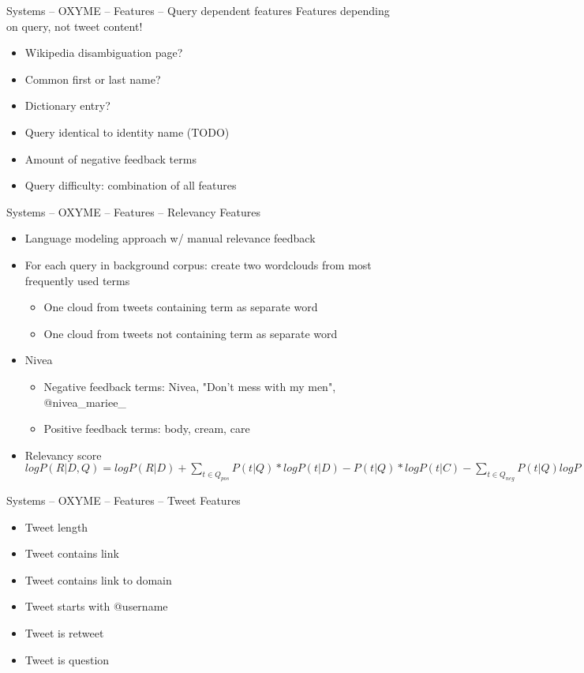 \documentclass[12pt,a4paper]{beamer}
\begin{document}
\begin{frame}{Systems -- OXYME -- Features -- Query dependent features}
Features depending on query, not tweet content!
\begin{itemize}
\item Wikipedia disambiguation page?
\item Common first or last name?
\item Dictionary entry?
\item Query identical to identity name (TODO)
\item Amount of negative feedback terms
\item Query difficulty: combination of all features
\end{itemize}

\end{frame}


\begin{frame}{Systems -- OXYME -- Features -- Relevancy Features}
\begin{itemize}
\item Language modeling approach w/ manual relevance feedback
\item For each query in background corpus: create two wordclouds from most frequently used terms
  \begin{itemize}
  \item One cloud from tweets containing term as separate word
  \item One cloud from tweets not containing term as separate word
  \end{itemize}
\item Nivea
  \begin{itemize}
  \item Negative feedback terms: Nivea, "Don't mess with my men", @nivea\_mariee\_
  \item Positive feedback terms: body, cream, care
  \end{itemize}
\item Relevancy score \begin{math} logP(R|D,Q) = logP(R|D) + \sum_{ t \in Q_{pos} } {P(t|Q)*logP(t|D) - P(t|Q)*logP(t|C)} - 
    \sum_{ t \in Q_{neg} } { P(t|Q)logP(t|D) - P(t|Q)logP(t|C) } \end{math}
\end{itemize}

\end{frame}

\begin{frame}{Systems -- OXYME -- Features -- Tweet Features}
\begin{itemize}
\item Tweet length
\item Tweet contains link
\item Tweet contains link to domain
\item Tweet starts with @username
\item Tweet is retweet
\item Tweet is question
\end{itemize}

\end{frame}
\end{document}
